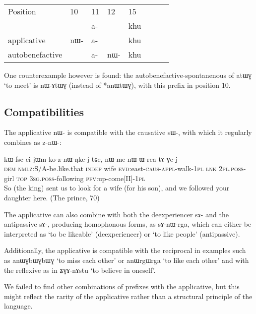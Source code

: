 \documentclass[oldfontcommands,twoside,a4paper,12pt]{article}
\newcommand{\ipa}[1]{{\phon \mbox{#1}}} %
\newcommand{\appl}{\textsc{appl}}
\newcommand{\aor}{\textsc{pfv}}
\newcommand{\caus}{\textsc{caus}}
\newcommand{\dem}{\textsc{dem}}
\newcommand{\evd}{\textsc{evd}}
\newcommand{\indef}{\textsc{indef}}
\newcommand{\nmlz}{\textsc{nmlz}}
\newcommand{\pl}{\textsc{pl}}
\newcommand{\poss}{\textsc{poss}}
\newcommand{\sg}{\textsc{sg}}
\newcommand{\topic}{\textsc{top}}
\begin{document}
\begin{tabular}{llllllll}
Position & 10 & 11 & 12 & 15 \\

& & \ipa{a-} & &\ipa{khu} \\
applicative& \ipa{nɯ-}& \ipa{a-} & &\ipa{khu} \\
autobenefactive& & \ipa{a-} & \ipa{nɯ-}&\ipa{khu} \\
\end{tabular}

One counterexample however is found: the autobenefactive-spontanenous of \ipa{atɯɣ} `to meet' is  \ipa{nɯ-ɤtɯɣ} (instead of *\ipa{anɯtɯɣ}), with this prefix in position 10.

\subsection{Compatibilities} \label{subsub:appl.compat}

 The applicative \ipa{nɯ-} is compatible with the causative \ipa{sɯ-}, with which it regularly combines as \ipa{z-nɯ-}:
    \begin{exe}
   \ex 
\gll \ipa{nɯ} 	\ipa{kɯ-fse} 	\ipa{ci} 	\ipa{jɯm} 	\ipa{ko-z-nɯ-ŋke-j} 	\ipa{tɕe,} 	\ipa{nɯ-me} 	\ipa{nɯ} 	\ipa{ɯ-rca} 	\ipa{tɤ-ɣe-j}    \\
   \dem{} \nmlz{}:S/A-be.like.that \indef{} wife \evd{}:east-\caus{}-\appl{}-walk-1\pl{} \textsc{lnk} 2\pl{}.\poss{}-girl \topic{} 3\sg{}.\poss{}-following \aor{}:up-come[II]-1\pl{}    \\
 \glt So (the king) sent us to look for a wife (for his son), and we followed your daughter here. (The prince, 70)
   \end{exe} 

The applicative can also  combine with both the deexperiencer \ipa{sɤ-} and the antipassive \ipa{sɤ-}, producing homophonous forms, as \ipa{sɤ-nɯ-rga}, which can either be interpreted as `to be likeable' (deexperiencer) or `to like people' (antipassive).
 
Additionally, the  applicative is  compatible with the reciprocal in examples such as \ipa{anɯɣbɯɣbɯɣ} `to miss each other' or \ipa{anɯrgɯrga} `to like each other' %
and with the reflexive as in \ipa{ʑɣɤ-nɤstu} `to believe in oneself'. %
 
We failed to find other combinations of prefixes with the applicative, but this might reflect the rarity of the applicative rather than a structural principle of the language.  
 
\end{document}
